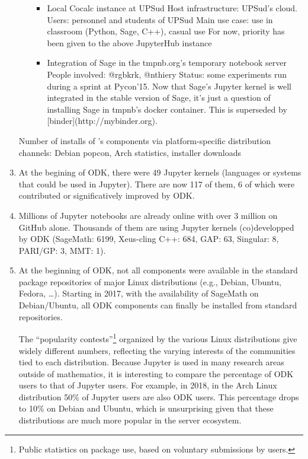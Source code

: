 \begin{enumerate}
\begin{itemize}
\begin{itemize}
\item Local Cocalc instance at UPSud
Host infrastructure: UPSud's cloud.
Users: personnel and students of UPSud
Main use case: use in classroom (Python, Sage, C++), casual use
For now, priority has been given to the above JupyterHub instance

\item Integration of Sage in the tmpnb.org's temporary notebook server
People involved: @rgbkrk, @nthiery
Status: some experiments run during a sprint at Pycon'15. Now that Sage's Jupyter kernel is well integrated in the stable version of Sage, it's just a question of installing Sage in tmpnb's docker container. This is superseded by [binder](http://mybinder.org).
\end{itemize}
\end{itemize}

\item [Number of installs of \ODK's components via platform-specific distribution channels: Debian popcon, Arch statistics, installer
  downloads]


\item At the begining of ODK, there were 49 Jupyter kernels (languages or systems that could be used in Jupyter). There are now 117 of them, 6 of which were contributed or significatively improved by ODK.
\item Millions of Jupyter notebooks are already online with over 3 million on GitHub alone. Thousands of them are using Jupyter kernels (co)developped by ODK (SageMath: 6199, Xeus-cling C++: 684, GAP: 63, Singular: 8, PARI/GP: 3, MMT: 1).

\item At the beginning of ODK, not all components were available in
  the standard package repositories of major Linux distributions
  (e.g., Debian, Ubuntu, Fedora, \dots). Starting in 2017, with
  the availability of SageMath on Debian/Ubuntu, all ODK components
  can finally be installed from standard repositories.

  The ``popularity contests''\footnote{Public statistics on package
    use, based on voluntary submissions by users.} organized by the
  various Linux distributions give widely different numbers,
  reflecting the varying interests of the communities tied to each
  distribution. Because Jupyter is used in many research areas outside
  of mathematics, it is interesting to compare the percentage of ODK
  users to that of Jupyter users.  For example, in 2018, in the Arch
  Linux distribution 50\% of Jupyter users are also ODK users.  This
  percentage drops to 10\% on Debian and Ubuntu, which is unsurprising
  given that these distributions are much more popular in the server
  ecosystem.


\end{enumerate}
